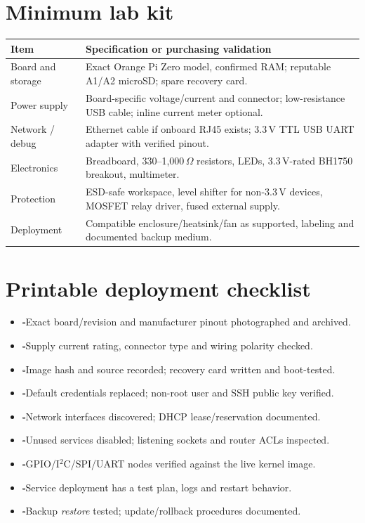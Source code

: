 \documentclass[10pt,oneside,openany]{report}
\newcommand{\checkitem}{\(\square\)\;}
\begin{document}
\section{Minimum lab kit}
\begin{center}\small\begin{tabularx}{\textwidth}{@{}p{3.5cm}X@{}}\toprule
\textbf{Item} & \textbf{Specification or purchasing validation}\\\midrule
Board and storage & Exact Orange Pi Zero model, confirmed RAM; reputable A1/A2 microSD; spare recovery card.\\
Power supply & Board-specific voltage/current and connector; low-resistance USB cable; inline current meter optional.\\
Network / debug & Ethernet cable if onboard RJ45 exists; 3.3\,V TTL USB UART adapter with verified pinout.\\
Electronics & Breadboard, 330--1,000\,\(\Omega\) resistors, LEDs, 3.3\,V-rated BH1750 breakout, multimeter.\\
Protection & ESD-safe workspace, level shifter for non-3.3\,V devices, MOSFET relay driver, fused external supply.\\
Deployment & Compatible enclosure/heatsink/fan as supported, labeling and documented backup medium.\\\bottomrule\end{tabularx}\end{center}
\section{Printable deployment checklist}
\begin{itemize}[itemsep=9pt]
\item \checkitem Exact board/revision and manufacturer pinout photographed and archived.
\item \checkitem Supply current rating, connector type and wiring polarity checked.
\item \checkitem Image hash and source recorded; recovery card written and boot-tested.
\item \checkitem Default credentials replaced; non-root user and SSH public key verified.
\item \checkitem Network interfaces discovered; DHCP lease/reservation documented.
\item \checkitem Unused services disabled; listening sockets and router ACLs inspected.
\item \checkitem GPIO/I\(^{2}\)C/SPI/UART nodes verified against the live kernel image.
\item \checkitem Service deployment has a test plan, logs and restart behavior.
\item \checkitem Backup \emph{restore} tested; update/rollback procedures documented.
\end{itemize}
\end{document}
